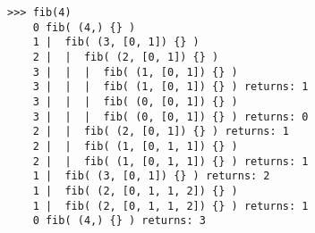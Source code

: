 \documentclass[11pt]{article}
\newenvironment{answer}{\large\lstset{basicstyle=\large}\color{white}}{}
\newenvironment{answer}{\large\lstset{basicstyle=\large}\color{red}}{}
\begin{document}
\begin{enumerate}
    \begin{answer}
    
\begin{verbatim}
>>> fib(4)
    0 fib( (4,) {} )
    1 |  fib( (3, [0, 1]) {} )
    2 |  |  fib( (2, [0, 1]) {} )
    3 |  |  |  fib( (1, [0, 1]) {} )
    3 |  |  |  fib( (1, [0, 1]) {} ) returns: 1
    3 |  |  |  fib( (0, [0, 1]) {} )
    3 |  |  |  fib( (0, [0, 1]) {} ) returns: 0
    2 |  |  fib( (2, [0, 1]) {} ) returns: 1
    2 |  |  fib( (1, [0, 1, 1]) {} )
    2 |  |  fib( (1, [0, 1, 1]) {} ) returns: 1
    1 |  fib( (3, [0, 1]) {} ) returns: 2
    1 |  fib( (2, [0, 1, 1, 2]) {} )
    1 |  fib( (2, [0, 1, 1, 2]) {} ) returns: 1
    0 fib( (4,) {} ) returns: 3
\end{verbatim}
    \end{answer}

\end{enumerate}
\end{document}
